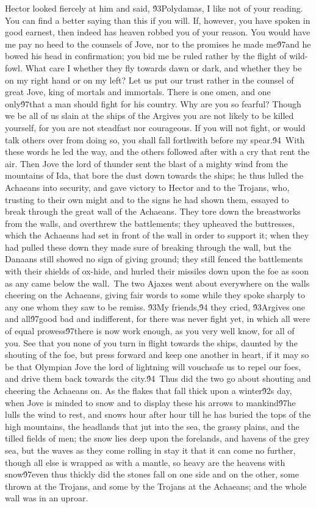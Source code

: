 {Hector looked fiercely at him and said, \'93Polydamas, I like not of your reading. You can find a better saying than this if you will. If, however, you have spoken in good earnest, then indeed has heaven robbed you of your reason. You would have me pay no heed to the counsels of Jove, nor to the promises he made me\'97and he bowed his head in confirmation; you bid me be ruled rather by the flight of wild-fowl. What care I whether they fly towards dawn or dark, and whether they be on my right hand or on my left? Let us put our trust rather in the counsel of great Jove, king of mortals and immortals. There is one omen, and one only\'97that a man should fight for his country. Why are you so fearful? Though we be all of us slain at the ships of the Argives you are not likely to be killed yourself, for you are not steadfast nor courageous. If you will not fight, or would talk others over from doing so, you shall fall forthwith before my spear.\'94\
With these words he led the way, and the others followed after with a cry that rent the air. Then Jove the lord of thunder sent the blast of a mighty wind from the mountains of Ida, that bore the dust down towards the ships; he thus lulled the Achaeans into security, and gave victory to Hector and to the Trojans, who, trusting to their own might and to the signs he had shown them, essayed to break through the great wall of the Achaeans. They tore down the breastworks from the walls, and overthrew the battlements; they upheaved the buttresses, which the Achaeans had set in front of the wall in order to support it; when they had pulled these down they made sure of breaking through the wall, but the Danaans still showed no sign of giving ground; they still fenced the battlements with their shields of ox-hide, and hurled their missiles down upon the foe as soon as any came below the wall.\
The two Ajaxes went about everywhere on the walls cheering on the Achaeans, giving fair words to some while they spoke sharply to any one whom they saw to be remiss. \'93My friends,\'94 they cried, \'93Argives one and all\'97good bad and indifferent, for there was never fight yet, in which all were of equal prowess\'97there is now work enough, as you very well know, for all of you. See that you none of you turn in flight towards the ships, daunted by the shouting of the foe, but press forward and keep one another in heart, if it may so be that Olympian Jove the lord of lightning will vouchsafe us to repel our foes, and drive them back towards the city.\'94\
Thus did the two go about shouting and cheering the Achaeans on. As the flakes that fall thick upon a winter\'92s day, when Jove is minded to snow and to display these his arrows to mankind\'97he lulls the wind to rest, and snows hour after hour till he has buried the tops of the high mountains, the headlands that jut into the sea, the grassy plains, and the tilled fields of men; the snow lies deep upon the forelands, and havens of the grey sea, but the waves as they come rolling in stay it that it can come no further, though all else is wrapped as with a mantle, so heavy are the heavens with snow\'97even thus thickly did the stones fall on one side and on the other, some thrown at the Trojans, and some by the Trojans at the Achaeans; and the whole wall was in an uproar.\
}
